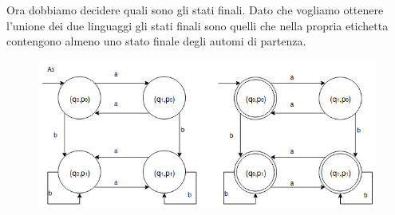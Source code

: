 Ora dobbiamo decidere quali sono gli stati finali. Dato che vogliamo ottenere l'unione dei due linguaggi gli stati finali sono quelli che nella propria etichetta contengono almeno uno stato finale degli automi di partenza.
\begin{figure}[H]
  \centering
    \includegraphics[width=1\textwidth]{a3}
\end{figure}
